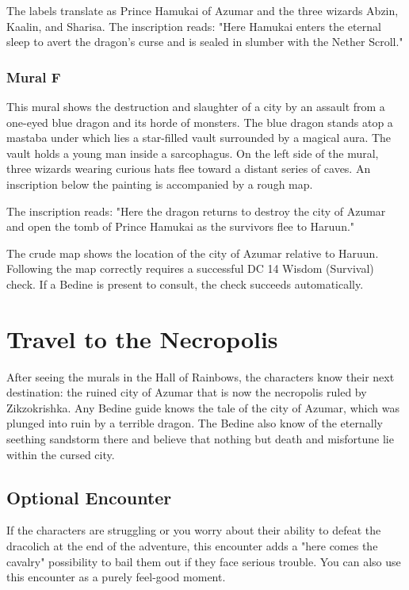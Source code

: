 \documentclass[10pt,a4paper,twoside,bg=print,twocolumn,openany,nodeprecatedcode]{dndbook}
\begin{document}
The labels translate as Prince Hamukai of Azumar and the three wizards Abzin, Kaalin, and Sharisa. The inscription reads: "Here Hamukai enters the eternal sleep to avert the dragon's curse and is sealed in slumber with the Nether Scroll."

\subsubsection{Mural F}
\begin{DndReadAloud}{}
This mural shows the destruction and slaughter of a city by an assault from a one-eyed blue dragon and its horde of monsters. The blue dragon stands atop a mastaba under which lies a star-filled vault surrounded by a magical aura. The vault holds a young man inside a sarcophagus. On the left side of the mural, three wizards wearing curious hats flee toward a distant series of caves. An inscription below the painting is accompanied by a rough map.

\end{DndReadAloud}

The inscription reads: "Here the dragon returns to destroy the city of Azumar and open the tomb of Prince Hamukai as the survivors flee to Haruun."

The crude map shows the location of the city of Azumar relative to Haruun. Following the map correctly requires a successful DC 14 Wisdom (Survival) check. If a Bedine is present to consult, the check succeeds automatically.

\section{Travel to the Necropolis}
After seeing the murals in the Hall of Rainbows, the characters know their next destination: the ruined city of Azumar that is now the necropolis ruled by Zikzokrishka. Any Bedine guide knows the tale of the city of Azumar, which was plunged into ruin by a terrible dragon. The Bedine also know of the eternally seething sandstorm there and believe that nothing but death and misfortune lie within the cursed city.

\subsection{Optional Encounter}
If the characters are struggling or you worry about their ability to defeat the dracolich at the end of the adventure, this encounter adds a "here comes the cavalry" possibility to bail them out if they face serious trouble. You can also use this encounter as a purely feel-good moment.
\end{document}
